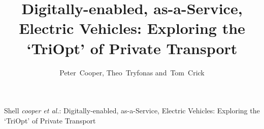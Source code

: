 \documentclass[journal]{IEEEtran}
\begin{document}
%
\title{Digitally-enabled, as-a-Service, Electric Vehicles: Exploring the `TriOpt' of Private Transport}
%
%
%

\author{Peter~Cooper, Theo~Tryfonas and~Tom~Crick}%

% 
%



%
{Shell \MakeLowercase{\textit{Cooper et al.}}: Digitally-enabled,
  as-a-Service, Electric Vehicles: Exploring the `TriOpt' of Private
  Transport}
% 
\end{document}
